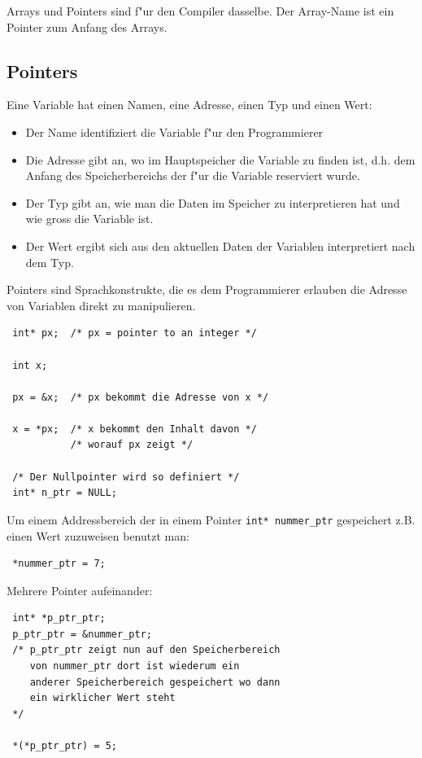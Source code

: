 \documentclass[german, 10pt, a4paper, twocolumn]{scrartcl}
\begin{document}
Arrays und Pointers sind f"ur den Compiler dasselbe. Der Array-Name ist ein Pointer zum Anfang des Arrays.

\subsection{Pointers}

Eine Variable hat einen Namen, eine Adresse, einen Typ und einen Wert:
\begin{itemize}
	\item Der Name identifiziert die Variable f"ur den Programmierer
	\item Die Adresse gibt an, wo im Hauptspeicher die Variable zu finden ist, d.h. dem Anfang des Speicherbereichs der f"ur die Variable reserviert wurde.
	\item Der Typ gibt an, wie man die Daten im Speicher zu interpretieren hat und wie gross die Variable ist.
	\item Der Wert ergibt sich aus den aktuellen Daten der Variablen interpretiert nach dem Typ.
\end{itemize}

Pointers sind Sprachkonstrukte, die es dem Programmierer erlauben die Adresse von Variablen direkt zu manipulieren.

\begin{verbatim}
 int* px;  /* px = pointer to an integer */
 
 int x;

 px = &x;  /* px bekommt die Adresse von x */

 x = *px;  /* x bekommt den Inhalt davon */
           /* worauf px zeigt */

 /* Der Nullpointer wird so definiert */
 int* n_ptr = NULL;
\end{verbatim}

Um einem Addressbereich der in einem Pointer \verb#int* nummer_ptr# gespeichert z.B. einen Wert zuzuweisen benutzt man:
\begin{verbatim}
 *nummer_ptr = 7;
\end{verbatim}

Mehrere Pointer aufeinander:
\begin{verbatim}
 int* *p_ptr_ptr;
 p_ptr_ptr = &nummer_ptr;
 /* p_ptr_ptr zeigt nun auf den Speicherbereich
    von nummer_ptr dort ist wiederum ein 
    anderer Speicherbereich gespeichert wo dann
    ein wirklicher Wert steht
 */

 *(*p_ptr_ptr) = 5;
\end{verbatim}
\end{document}
